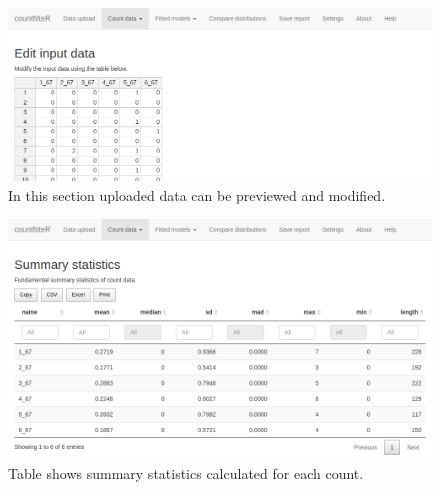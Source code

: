 \begin{figure}[htbp]
  \centering
  \includegraphics[width=0.99\columnwidth]{fig/cf_cd1.png}
  \caption{In this section uploaded data can be previewed and modified.}
    \label{cf_cd1}
\end{figure}

\begin{figure}[htbp]
  \centering
  \includegraphics[width=0.99\columnwidth]{fig/cf_cd2.png}
  \caption{Table shows summary statistics calculated for each count.}
    \label{cf_cd2}
\end{figure}

